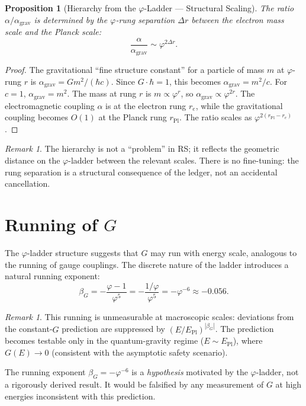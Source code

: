 \documentclass[12pt,a4paper]{article}
\newtheorem{proposition}[theorem]{Proposition}
\theoremstyle{definition}
\theoremstyle{remark}
\newtheorem{remark}[theorem]{Remark}
\begin{document}
\begin{proposition}[Hierarchy from the $\varphi$-Ladder --- Structural Scaling]
\label{thm:hierarchy}
The ratio $\alpha/\alpha_{\mathrm{grav}}$ is determined by the
$\varphi$-rung separation $\Delta r$ between the electron mass
scale and the Planck scale:
\begin{equation}
  \frac{\alpha}{\alpha_{\mathrm{grav}}} \sim
  \varphi^{2\Delta r}.
\end{equation}
\end{proposition}

\begin{proof}
The gravitational ``fine structure constant'' for a particle
of mass $m$ at $\varphi$-rung $r$ is
$\alpha_{\mathrm{grav}} = G m^2 / (\hbar c)$.
Since $G \cdot \hbar = 1$, this becomes
$\alpha_{\mathrm{grav}} = m^2 / c$.  For $c = 1$,
$\alpha_{\mathrm{grav}} = m^2$.  The mass at rung $r$ is
$m \propto \varphi^r$, so
$\alpha_{\mathrm{grav}} \propto \varphi^{2r}$.  The
electromagnetic coupling $\alpha$ is at the electron rung
$r_e$, while the gravitational coupling becomes $O(1)$ at the
Planck rung $r_{\mathrm{Pl}}$.  The ratio scales as
$\varphi^{2(r_{\mathrm{Pl}} - r_e)}$.
\end{proof}

\begin{remark}
The hierarchy is not a ``problem'' in RS; it reflects the
geometric distance on the $\varphi$-ladder between the
relevant scales.  There is no fine-tuning: the rung
separation is a structural consequence of the ledger, not an
accidental cancellation.
\end{remark}

\section{Running of $G$}
\label{sec:running}

The $\varphi$-ladder structure suggests that $G$ may run with
energy scale, analogous to the running of gauge couplings.
The discrete nature of the ladder introduces a natural
running exponent:
\begin{equation}
  \beta_G = -\frac{\varphi - 1}{\varphi^5}
  = -\frac{1/\varphi}{\varphi^5}
  = -\varphi^{-6}
  \approx -0.056.
\end{equation}

\begin{remark}
This running is unmeasurable at macroscopic scales:
deviations from the constant-$G$ prediction are suppressed
by $(E/E_{\mathrm{Pl}})^{|\beta_G|}$.  The prediction
becomes testable only in the quantum-gravity regime
($E \sim E_{\mathrm{Pl}}$), where $G(E) \to 0$
(consistent with the asymptotic safety scenario).

The running exponent $\beta_G = -\varphi^{-6}$ is a
\emph{hypothesis} motivated by the $\varphi$-ladder, not a
rigorously derived result.  It would be falsified by any
measurement of $G$ at high energies inconsistent with this
prediction.
\end{remark}
\end{document}
